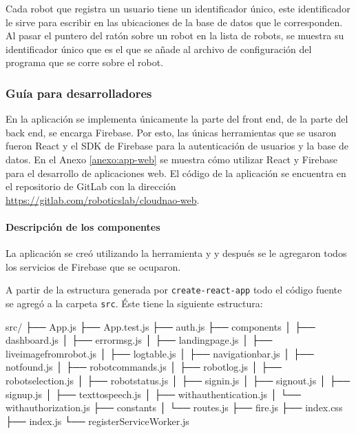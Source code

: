 Cada robot que registra un usuario tiene un identificador único, este identificador
le sirve para escribir en las ubicaciones de la base de datos que le corresponden.
Al pasar el puntero del ratón sobre un robot en la lista de robots, se muestra
su identificador único que es el que se añade al archivo de configuración
del programa que se corre sobre el robot.


\subsubsection{Guía para desarrolladores}
\label{\detokenize{code_docs:documentacion-para-desarrolladores}}\label{\detokenize{code_docs::doc}}
En la aplicación se implementa únicamente la parte del front end, de la parte
del back end, se encarga Firebase. Por esto, las únicas herramientas que se
usaron fueron React y el SDK de Firebase para la autenticación de usuarios y la base
de datos.
En el Anexo \ref{anexo:app-web} se muestra cómo 
utilizar React y Firebase para el desarrollo
de aplicaciones web.
El código de la aplicación
se encuentra en el repositorio 
de GitLab con la dirección \url{https://gitlab.com/roboticslab/cloudnao-web}.


\paragraph{Descripción de los componentes}
\label{\detokenize{code_docs:creacion-del-proyecto}}

La aplicación se creó utilizando la herramienta
 y 
y después se le agregaron todos los servicios de Firebase
que se ocuparon. 

A partir de la estructura generada por \texttt{create-react-app}
todo el código fuente se agregó a la carpeta
\texttt{src}. Éste tiene la siguiente estructura:


%
\begin{sphinxVerbatim}[commandchars=\\\{\}]
src/
├── App.js
├── App.test.js
├── auth.js
├── components
│   ├── dashboard.js
│   ├── error\PYGZus{}msg.js
│   ├── landing\PYGZus{}page.js
│   ├── live\PYGZus{}image\PYGZus{}from\PYGZus{}robot.js
│   ├── log\PYGZus{}table.js
│   ├── navigation\PYGZus{}bar.js
│   ├── not\PYGZus{}found.js
│   ├── robot\PYGZus{}commands.js
│   ├── robot\PYGZus{}log.js
│   ├── robot\PYGZus{}selection.js
│   ├── robot\PYGZus{}status.js
│   ├── signin.js
│   ├── signout.js
│   ├── signup.js
│   ├── text\PYGZus{}to\PYGZus{}speech.js
│   ├── with\PYGZus{}authentication.js
│   └── with\PYGZus{}authorization.js
├── constants
│   └── routes.js
├── fire.js
├── index.css
├── index.js
└── registerServiceWorker.js
\end{sphinxVerbatim}


